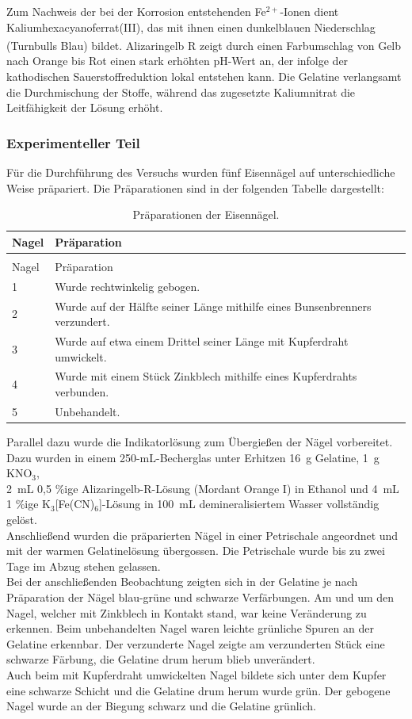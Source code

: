 \documentclass[
	a4paper,										%
	12pt,											%
	twoside,										%
	headsepline,								%
	footsepline,									%
	captions=tableheading,					%
]{scrartcl}
\newcommand{\zitat}[1]{\textsuperscript{\cite{#1}}}
\newcommand{\langetabelle}[6]{  %
	\begin{centering}           %
		{\begin{longtable}[#3]{#4}
				\caption{#2\label{tab: #1}}\\				
				\hline
				#5
				\hline
				\endfirsthead
                \caption{#2\label{tab: #1}}\\
				\hline
				#5
				\hline
				\endhead
				#6												
				\hline 
		\end{longtable}}
\end{centering}}
\begin{document}
Zum Nachweis der bei der Korrosion entstehenden Fe$^{2+}$-Ionen dient Kaliumhexacyanoferrat(III),
das mit ihnen einen dunkelblauen Niederschlag (Turnbulls Blau) bildet.\zitat{vier}
Alizaringelb R zeigt durch einen Farbumschlag von Gelb nach Orange bis Rot einen stark erhöhten pH-Wert an,
der infolge der kathodischen Sauerstoffreduktion lokal entstehen kann.
Die Gelatine verlangsamt die Durchmischung der Stoffe, während das zugesetzte Kaliumnitrat die Leitfähigkeit der Lösung erhöht.

\subsubsection{Experimenteller Teil}

Für die Durchführung des Versuchs wurden fünf Eisennägel auf unterschiedliche Weise präpariert. Die Präparationen sind in der folgenden Tabelle dargestellt:

\langetabelle
	{Tabelle}
	{Präparationen der Eisennägel.}
	{H}
	{p{2cm} p{9cm}}
	{Nagel & Präparation\\}
	{ 1 & Wurde rechtwinkelig gebogen. \\
	2 & Wurde auf der Hälfte seiner Länge mithilfe eines Bunsenbrenners verzundert. \\
	3 & Wurde auf etwa einem Drittel seiner Länge mit Kupferdraht umwickelt. \\
	4 & Wurde mit einem Stück Zinkblech mithilfe eines Kupferdrahts verbunden. \\
	5 & Unbehandelt. \\
	}

Parallel dazu wurde die Indikatorlösung zum Übergießen der Nägel vorbereitet.
Dazu wurden in einem 250-mL-Becherglas unter Erhitzen 16~g Gelatine,
1~g KNO$_3$,\\ 2~mL 0,5 \%ige Alizaringelb-R-Lösung (Mordant Orange I) in Ethanol und 4~mL 1 \%ige K$_3$[Fe(CN)$_6$]-Lösung in 100~mL demineralisiertem Wasser vollständig gelöst.\\
Anschließend wurden die präparierten Nägel in einer Petrischale angeordnet und mit der warmen Gelatinelösung übergossen. Die Petrischale wurde bis zu zwei Tage im Abzug stehen gelassen.\\
Bei der anschließenden Beobachtung zeigten sich in der Gelatine je nach Präparation der Nägel blau-grüne und schwarze Verfärbungen.
Am und um den Nagel, welcher mit Zinkblech in Kontakt stand, war keine Veränderung zu erkennen. Beim unbehandelten Nagel waren leichte grünliche Spuren an der Gelatine erkennbar.
Der verzunderte Nagel zeigte am verzunderten Stück eine schwarze Färbung, die Gelatine drum herum blieb unverändert.\\
Auch beim mit Kupferdraht umwickelten Nagel bildete sich unter dem Kupfer eine schwarze Schicht und die Gelatine drum herum wurde grün.
Der gebogene Nagel wurde an der Biegung schwarz und die Gelatine grünlich.
\end{document}
